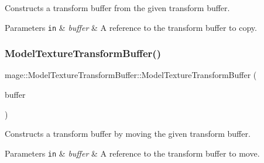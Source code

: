 Constructs a transform buffer from the given transform buffer.


\begin{DoxyParams}[1]{Parameters}
\mbox{\tt in}  & {\em buffer} & A reference to the transform buffer to copy. \\
\hline
\end{DoxyParams}
\hypertarget{structmage_1_1_model_texture_transform_buffer_a35516b344752486fa40cd14b59e17ec9}{}\label{structmage_1_1_model_texture_transform_buffer_a35516b344752486fa40cd14b59e17ec9} 
\subsubsection{\texorpdfstring{Model\+Texture\+Transform\+Buffer()}{ModelTextureTransformBuffer()}\hspace{0.1cm}{\footnotesize\ttfamily [3/3]}}
{\footnotesize\ttfamily mage\+::\+Model\+Texture\+Transform\+Buffer\+::\+Model\+Texture\+Transform\+Buffer (\begin{DoxyParamCaption}\item[{\hyperlink{structmage_1_1_model_texture_transform_buffer}{Model\+Texture\+Transform\+Buffer} \&\&}]{buffer }\end{DoxyParamCaption})\hspace{0.3cm}{\ttfamily [default]}}

Constructs a transform buffer by moving the given transform buffer.


\begin{DoxyParams}[1]{Parameters}
\mbox{\tt in}  & {\em buffer} & A reference to the transform buffer to move. \\
\hline
\end{DoxyParams}
\hypertarget{structmage_1_1_model_texture_transform_buffer_a855c8ccaefe9bac3fd10cdc143616cd9}{}\label{structmage_1_1_model_texture_transform_buffer_a855c8ccaefe9bac3fd10cdc143616cd9} 
